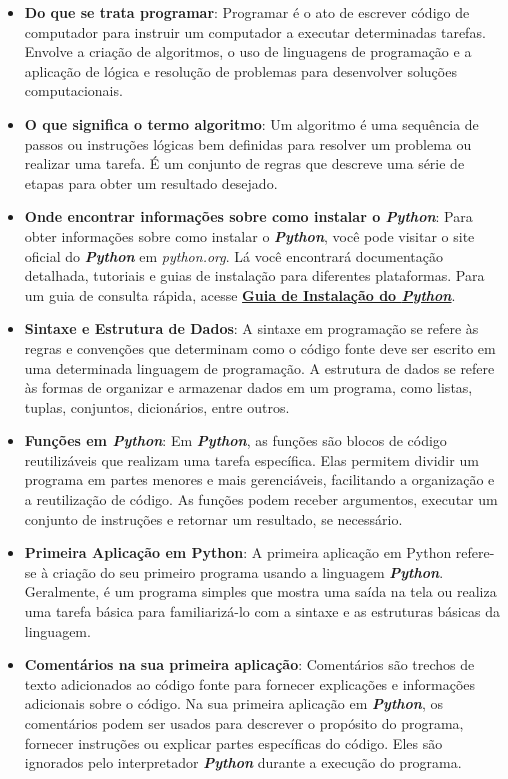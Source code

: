 \documentclass[a4paper, 12pt, onecolumn,singlespacing]{article}
\begin{document}
	\begin{itemize}
		
		\item \textbf{Do que se trata programar}: Programar é o ato de escrever código de computador para instruir um computador a executar determinadas tarefas. Envolve a criação de algoritmos, o uso de linguagens de programação e a aplicação de lógica e resolução de problemas para desenvolver soluções computacionais.
		
		\item \textbf{O que significa o termo algoritmo}: Um algoritmo é uma sequência de passos ou instruções lógicas bem definidas para resolver um problema ou realizar uma tarefa. É um conjunto de regras que descreve uma série de etapas para obter um resultado desejado.
		
		\item \textbf{Onde encontrar informações sobre como instalar o \textit{Python}}: Para obter informações sobre como instalar o \textbf{\textit{Python}}, você pode visitar o site oficial do \textbf{\textit{Python}} em \textit{python.org}. Lá você encontrará documentação detalhada, tutoriais e guias de instalação para diferentes plataformas. Para um guia de consulta rápida, acesse \href{Guia_Instalacao_Python.pdf}{\textbf{Guia de Instalação do \textit{\textbf{Python}}}}.
		
		\item \textbf{Sintaxe e Estrutura de Dados}: A sintaxe em programação se refere às regras e convenções que determinam como o código fonte deve ser escrito em uma determinada linguagem de programação. A estrutura de dados se refere às formas de organizar e armazenar dados em um programa, como listas, tuplas, conjuntos, dicionários, entre outros.
		
		\item \textbf{Funções em \textit{Python}}: Em \textbf{\textit{Python}}, as funções são blocos de código reutilizáveis que realizam uma tarefa específica. Elas permitem dividir um programa em partes menores e mais gerenciáveis, facilitando a organização e a reutilização de código. As funções podem receber argumentos, executar um conjunto de instruções e retornar um resultado, se necessário.
		
		\item \textbf{Primeira Aplicação em Python}: A primeira aplicação em Python refere-se à criação do seu primeiro programa usando a linguagem \textit{\textbf{Python}}. Geralmente, é um programa simples que mostra uma saída na tela ou realiza uma tarefa básica para familiarizá-lo com a sintaxe e as estruturas básicas da linguagem.
		
		\item \textbf{Comentários na sua primeira aplicação}: Comentários são trechos de texto adicionados ao código fonte para fornecer explicações e informações adicionais sobre o código. Na sua primeira aplicação em \textit{\textbf{Python}}, os comentários podem ser usados para descrever o propósito do programa, fornecer instruções ou explicar partes específicas do código. Eles são ignorados pelo interpretador \textbf{\textit{Python}} durante a execução do programa.
		
	\end{itemize}
	
\end{document}
